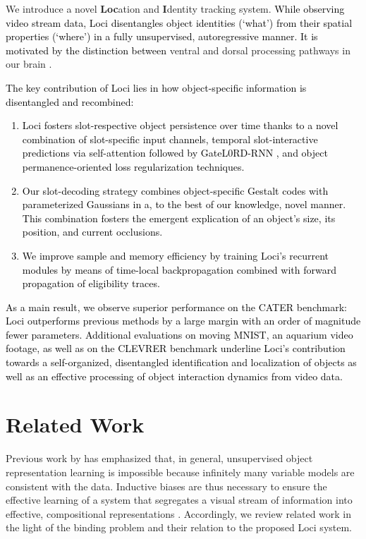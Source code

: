 \documentclass{article} \usepackage{iclr2023_conference_arxiv,times}
\newcommand{\changed}{\textcolor{black}}
\begin{document}
We introduce a novel \textbf{Loc}ation and \textbf{I}dentity tracking system.
\changed{While observing video stream data, Loci disentangles object identities (`what') from their spatial properties (`where') in a fully unsupervised, autoregressive manner.
It is motivated by the distinction between}
ventral and dorsal processing pathways in our brain \cite{Mishkin:1983,Ungerleider:1994}.
\changed{
The key contribution of Loci lies in how object-specific information is disentangled and recombined: 
\begin{enumerate}[label=\textbf{(\roman*)}]
    \item Loci fosters slot-respective object persistence over time thanks to a novel combination of slot-specific input channels, temporal slot-interactive predictions via self-attention \citep{vaswani2017attention} followed by GateL0RD-RNN \citep{gumbsch2021sparsely}, and object permanence-oriented loss regularization techniques.
    \item Our slot-decoding strategy combines object-specific Gestalt codes with parameterized Gaussians in a, to the best of our knowledge, novel manner. This combination fosters the emergent explication of an object's size, its position, and current occlusions.
    \item We improve sample and memory efficiency by training Loci's recurrent modules by means of time-local backpropagation combined with forward propagation of eligibility traces.
\end{enumerate}
As a main result, we observe superior performance on the CATER benchmark: Loci outperforms previous methods by a large margin with an order of magnitude fewer parameters.  
Additional evaluations on moving MNIST, an aquarium video footage, as well as on the CLEVRER benchmark underline Loci's contribution towards a self-organized, disentangled identification and localization of objects as well as an effective processing of object interaction dynamics from video data.
}
\section{Related Work}
Previous work by \cite{locatello18assumptions} has emphasized that, in general, unsupervised object representation learning is impossible because infinitely many variable models are consistent with the data.
Inductive biases are thus necessary to ensure the effective learning of a system that segregates a visual stream of information into effective, compositional representations \cite{greff2020binding}.
Accordingly, we review related work in the light of the binding problem and their relation to the proposed Loci system.
\end{document}

